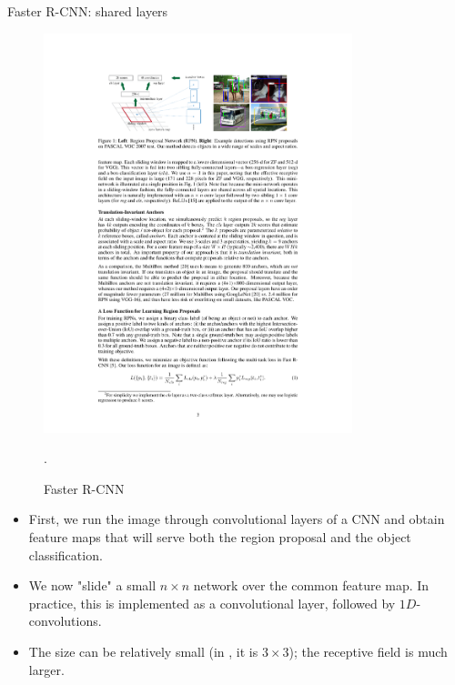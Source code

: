 \documentclass[xcolor=pdftex,dvipsnames,table]{beamer}
\begin{document}
\begin{frame}{Faster R-CNN: shared layers}
\begin{figure}[htb]
   \centering
   \includegraphics[width=0.8\textwidth]{../graphics/Faster_R-CNN.pdf}
   \caption{Faster R-CNN \cite{Ren2017}}.
\end{figure}
\begin{itemize}
\item First, we run the image through convolutional layers of a CNN and obtain feature maps that will serve both the region proposal and the object classification. 
\item We now "slide" a small $n \times n$ network over the common feature map. In practice, this is implemented as a convolutional layer, followed by $1D$-convolutions. 
\item The size can be relatively small (in \cite{Ren2017}, it is $3 \times 3$); the receptive field is much larger. 
\end{itemize}
\end{frame}
\end{document}
